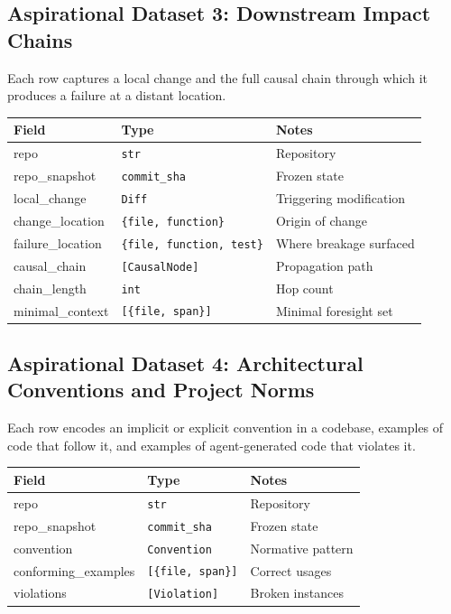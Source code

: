 \documentclass[a4paper,12pt]{article}
\begin{document}
\subsection*{Aspirational Dataset 3: Downstream Impact Chains}

\noindent Each row captures a local change and the full causal chain through which it produces a failure at a distant location.

\begin{tcolorbox}[title=ChangeImpact]
\footnotesize
\begin{tabularx}{\linewidth}{@{} l l Y @{}}
\toprule
\textbf{Field} & \textbf{Type} & \textbf{Notes} \\
\midrule
repo & \texttt{str} & Repository \\
repo\_snapshot & \texttt{commit\_sha} & Frozen state \\
local\_change & \texttt{Diff} & Triggering modification \\
change\_location & \texttt{\{file, function\}} & Origin of change \\
failure\_location & \texttt{\{file, function, test\}} & Where breakage surfaced \\
causal\_chain & \texttt{[CausalNode]} & Propagation path \\
chain\_length & \texttt{int} & Hop count \\
minimal\_context & \texttt{[\{file, span\}]} & Minimal foresight set \\
\bottomrule
\end{tabularx}
\end{tcolorbox}

\newpage
\subsection*{Aspirational Dataset 4: Architectural Conventions and Project Norms}

\noindent Each row encodes an implicit or explicit convention in a codebase, examples of code that follow it, and examples of agent-generated code that violates it.

\begin{tcolorbox}[title=ConventionSchema]
\footnotesize
\begin{tabularx}{\linewidth}{@{} l l Y @{}}
\toprule
\textbf{Field} & \textbf{Type} & \textbf{Notes} \\
\midrule
repo & \texttt{str} & Repository \\
repo\_snapshot & \texttt{commit\_sha} & Frozen state \\
convention & \texttt{Convention} & Normative pattern \\
conforming\_examples & \texttt{[\{file, span\}]} & Correct usages \\
violations & \texttt{[Violation]} & Broken instances \\
\bottomrule
\end{tabularx}
\end{tcolorbox}
\end{document}
